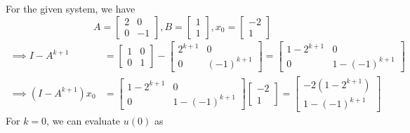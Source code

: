 For the given system, we have
\[
    A=\left[\begin{array}{cc}
            2 & 0  \\
            0 & -1
        \end{array}\right], B=\left[\begin{array}{l}
            1 \\
            1
        \end{array}\right], x_{0}=\left[\begin{array}{c}
            -2 \\
            1
        \end{array}\right]
\]
\begin{align*}
    \implies
    I - A^{k + 1}
     & =
    \left[\begin{array}{cc}
                  1 & 0 \\
                  0 & 1
              \end{array}\right]
    -
    \left[\begin{array}{cc}
                  2^{k + 1} & 0            \\
                  0         & (-1)^{k + 1}
              \end{array}\right]
    =
    \left[\begin{array}{cc}
                  1 - 2^{k + 1} & 0                \\
                  0             & 1 - (-1)^{k + 1}
              \end{array}\right]
    \\
    \implies
    (I - A^{k + 1}) x_0
     & =
    \left[\begin{array}{cc}
                  1 - 2^{k + 1} & 0                \\
                  0             & 1 - (-1)^{k + 1}
              \end{array}\right]
    \left[\begin{array}{c}
                  -2 \\
                  1
              \end{array}\right]
    =
    \left[\begin{array}{c}
                  -2(1 - 2^{k + 1}) \\
                  1 - (-1)^{k + 1}
              \end{array}\right]
\end{align*}
For \( k = 0 \), we can evaluate \( u(0) \) as
